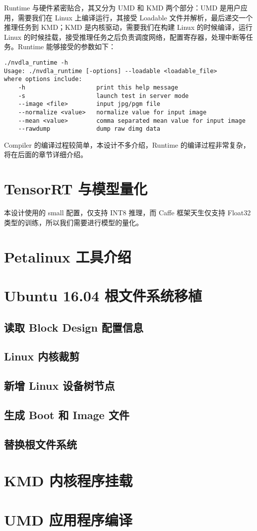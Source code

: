 Runtime 与硬件紧密贴合，其又分为 UMD 和 KMD 两个部分：UMD 是用户应用，需要我们在 Linux 上编译运行，其接受 Loadable 文件并解析，最后递交一个推理任务到 KMD；KMD 是内核驱动，需要我们在构建 Linux 的时候编译，运行 Linux 的时候挂载，接受推理任务之后负责调度网络，配置寄存器，处理中断等任务。Runtime 能够接受的参数如下：

\lstset{language=Bash}
\begin{lstlisting}
./nvdla_runtime -h
Usage: ./nvdla_runtime [-options] --loadable <loadable_file>
where options include:
    -h                    print this help message
    -s                    launch test in server mode
    --image <file>        input jpg/pgm file
    --normalize <value>   normalize value for input image
    --mean <value>        comma separated mean value for input image
    --rawdump             dump raw dimg data

\end{lstlisting}

Compiler 的编译过程较简单，本设计不多介绍，Runtime 的编译过程非常复杂，将在后面的章节详细介绍。

\section{TensorRT 与模型量化}

本设计使用的 small 配置，仅支持 INT8 推理，而 Caffe 框架天生仅支持 Float32 类型的训练，所以我们需要进行模型的量化。

\section{Petalinux 工具介绍}


\section{Ubuntu 16.04 根文件系统移植}

\subsection{读取 Block Design 配置信息}

\subsection{Linux 内核裁剪}

\subsection{新增 Linux 设备树节点}

\subsection{生成 Boot 和 Image 文件}

\subsection{替换根文件系统}

\section{KMD 内核程序挂载}

\section{UMD 应用程序编译}
